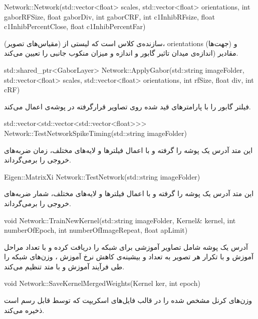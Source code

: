 \begin{C++source}
Network::Network(std::vector<float> scales, std::vector<float> orientations, int gaborRFSize, float gaborDiv, int gaborCRF, int c1InhibRFsize, float c1InhibPercentClose, float c1InhibPercentFar)
\end{C++source}
سازنده‌ی کلاس  است که لیستی از  (مقیاس‌های تصویر)، orientations (جهت‌ها) و مقادیر  (اندازه‌ی میدان تاثیر گابور و اندازه‌ و میزان منکوب جانبی را تعیین می‌کند.

\begin{C++source}
std::shared_ptr<GaborLayer> Network::ApplyGabor(std::string imageFolder, std::vector<float> scales, std::vector<float> orientations, int rfSize, float div, int cRF)
\end{C++source}

فیلتر گابور را با پارامترهای قید شده روی تصاویر قرارگرفته در پوشه‌ی  اعمال می‌کند.

\begin{C++source}
std::vector<std::vector<std::vector<float>>> Network::TestNetworkSpikeTiming(std::string imageFolder)
\end{C++source}
این متد آدرس یک پوشه را گرفته و با اعمال فیلتر‌ها و لایه‌های مختلف، زمان ضربه‌های خروجی را برمی‌گرداند.

\begin{C++source}
Eigen::MatrixXi Network::TestNetwork(std::string imageFolder)
\end{C++source}

این متد آدرس یک پوشه را گرفته و با اعمال فیلتر‌ها و لایه‌های مختلف، شمار ضربه‌های خروجی را برمی‌گرداند.

\begin{C++source}
void Network::TrainNewKernel(std::string imageFolder, Kernel& kernel, int numberOfEpoch, int numberOfImageRepeat, float apLimit)
\end{C++source}

آدرس یک پوشه شامل تصاویر آموزشی برای شبکه را دریافت کرده و با تعداد مراحل آموزش   و با تکرار هر تصویر به تعداد  و بیشینه‌ی کاهش نرخ آموزش ، وزن‌های شبکه را طی فرآیند آموزش و با متد  تنظیم می‌کند.

\begin{C++source}
void Network::SaveKernelMergedWeights(Kernel ker, int epoch)
\end{C++source}
وزن‌های کرنل مشخص شده را در قالب فایل‌های اسکریپت که توسط  قابل رسم است ذخیره می‌کند.